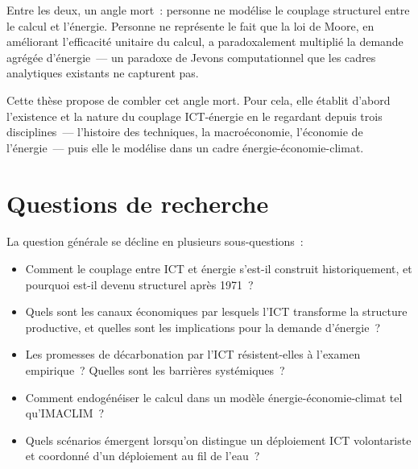 Entre les deux, un angle mort~: personne ne modélise le couplage structurel entre le calcul et l'énergie. Personne ne représente le fait que la loi de Moore, en améliorant l'efficacité unitaire du calcul, a paradoxalement multiplié la demande agrégée d'énergie~--- un paradoxe de Jevons computationnel que les cadres analytiques existants ne capturent pas.

Cette thèse propose de combler cet angle mort. Pour cela, elle établit d'abord l'existence et la nature du couplage ICT-énergie en le regardant depuis trois disciplines~--- l'histoire des techniques, la macroéconomie, l'économie de l'énergie~--- puis elle le modélise dans un cadre énergie-économie-climat.

\section*{Questions de recherche}

La question générale se décline en plusieurs sous-questions~:

\begin{itemize}
    \item Comment le couplage entre ICT et énergie s'est-il construit historiquement, et pourquoi est-il devenu structurel après 1971~?
    \item Quels sont les canaux économiques par lesquels l'ICT transforme la structure productive, et quelles sont les implications pour la demande d'énergie~?
    \item Les promesses de décarbonation par l'ICT résistent-elles à l'examen empirique~? Quelles sont les barrières systémiques~?
    \item Comment endogénéiser le calcul dans un modèle énergie-économie-climat tel qu'IMACLIM~?
    \item Quels scénarios émergent lorsqu'on distingue un déploiement ICT volontariste et coordonné d'un déploiement au fil de l'eau~?
\end{itemize}